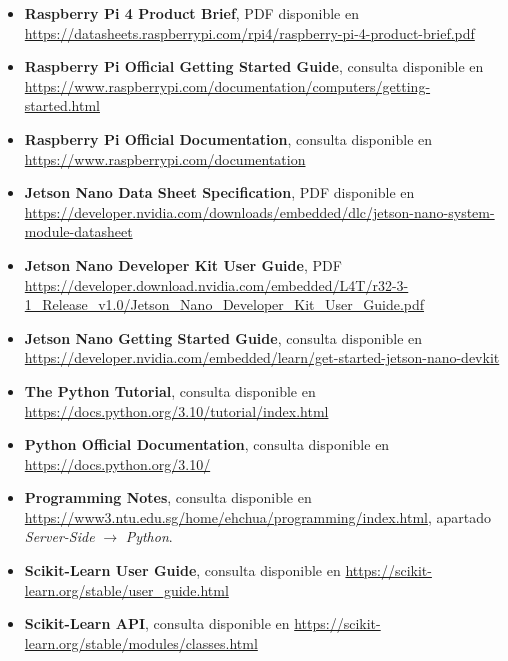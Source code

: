 \documentclass[00-Trabajo_Final.tex]{subfiles}
\begin{document}
\begin{itemize}[itemsep=2pt]
    \item \textbf{Raspberry Pi 4 Product Brief}, PDF disponible en \url{https://datasheets.raspberrypi.com/rpi4/raspberry-pi-4-product-brief.pdf}
    \item \textbf{Raspberry Pi Official Getting Started Guide}, consulta disponible en \url{https://www.raspberrypi.com/documentation/computers/getting-started.html}
    \item \textbf{Raspberry Pi Official Documentation}, consulta disponible en \url{https://www.raspberrypi.com/documentation}
    \item \textbf{Jetson Nano Data Sheet Specification}, PDF disponible en \url{https://developer.nvidia.com/downloads/embedded/dlc/jetson-nano-system-module-datasheet}
    \item \textbf{Jetson Nano Developer Kit User Guide}, PDF \url{https://developer.download.nvidia.com/embedded/L4T/r32-3-1_Release_v1.0/Jetson_Nano_Developer_Kit_User_Guide.pdf}
    \item \textbf{Jetson Nano Getting Started Guide}, consulta disponible en \url{https://developer.nvidia.com/embedded/learn/get-started-jetson-nano-devkit}
    \item \textbf{The Python Tutorial}, consulta disponible en \url{https://docs.python.org/3.10/tutorial/index.html}
    \item \textbf{Python Official Documentation}, consulta disponible en \url{https://docs.python.org/3.10/}
    \item \textbf{Programming Notes}, consulta disponible en \url{https://www3.ntu.edu.sg/home/ehchua/programming/index.html}, apartado \textit{Server-Side} $\xrightarrow{}$ \textit{Python}.
    \item \textbf{Scikit-Learn User Guide}, consulta disponible en \url{https://scikit-learn.org/stable/user_guide.html}
    \item \textbf{Scikit-Learn API}, consulta disponible en \url{https://scikit-learn.org/stable/modules/classes.html}
\end{itemize}
\end{document}

